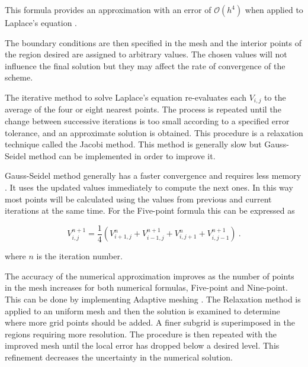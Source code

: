 \documentclass[a4paper]{jpconf}
\begin{document}
\noindent This formula provides an approximation with an error of $\mathcal{O}(h^4)$ when applied to Laplace's equation \cite{AI-numericalAna}. 

The boundary conditions are then specified in the mesh and the interior points of the region desired are assigned to arbitrary values. The chosen values will not influence the final solution but they may affect the rate of convergence of the scheme. \par

The iterative method to solve Laplace's equation re-evaluates each $V_{i,j}$ to the average of the four or eight nearest points. The process is repeated until the change between successive iterations is too small according to a specified error tolerance, and an approximate solution is obtained. 
This procedure is a relaxation technique called the Jacobi method. This method is generally slow but Gauss-Seidel method can be implemented in order to improve it. \par

Gauss-Seidel method generally has a faster convergence and requires less memory \cite{Cheney.Kincai-NumericalMethods}. It uses the updated values immediately to compute the next ones. In this way most points will be calculated using the values from previous and current iterations at the same time. For the Five-point formula this can be expressed as

\begin{equation}
V_{i,j}^{n+1} = \frac{1}{4}(V_{i+1,j}^{n} + V_{i-1,j}^{n+1} + V_{i,j+1}^{n} + V_{i,j-1}^{n+1})~.
\end{equation}

\noindent where $n$ is the iteration number. 

The accuracy of the numerical approximation improves as the number of points in the mesh increases for both numerical formulas, Five-point and Nine-point. This can be done by implementing Adaptive meshing \cite{Press.T.V.F-NumericalRecipes}. The Relaxation method is applied to an uniform mesh and then the solution is examined to determine where more grid points should be added. A finer subgrid is superimposed in the regions requiring more resolution. The procedure is then repeated with the improved mesh until the local error has dropped below a desired level. This refinement decreases the uncertainty in the numerical solution.
\end{document}
